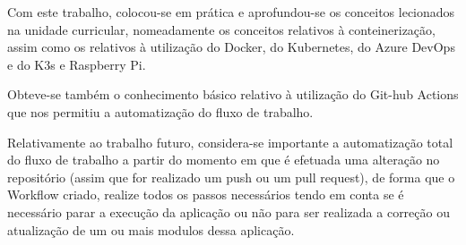 
\par Com este trabalho, colocou-se em prática e aprofundou-se os conceitos lecionados na unidade curricular, nomeadamente os conceitos relativos à conteinerização, assim como os relativos à utilização do Docker, do Kubernetes, do Azure DevOps e do K3s e Raspberry Pi.

\par Obteve-se também o conhecimento básico relativo à utilização do Git-hub Actions que nos permitiu a automatização do fluxo de trabalho.

\par Relativamente ao trabalho futuro, considera-se importante a automatização total do fluxo de trabalho a partir do momento em que é efetuada uma alteração no repositório (assim que for realizado um push ou um pull request), de forma que o Workflow criado, realize todos os passos necessários tendo em conta se é necessário parar a execução da aplicação ou não para ser realizada a correção ou atualização de um ou mais modulos dessa aplicação.
